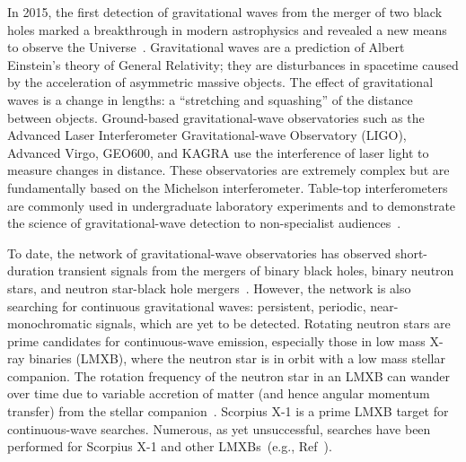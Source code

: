 \documentclass[paper-main.tex]{subfiles}
\begin{document}
In 2015, the first detection of gravitational waves from the merger of two black holes marked a breakthrough in modern astrophysics and revealed a new means to observe the Universe~\cite{GW150914}.
Gravitational waves are a prediction of Albert Einstein's theory of General Relativity; they are disturbances in spacetime caused by the acceleration of asymmetric massive objects.
The effect of gravitational waves is a change in lengths: a ``stretching and squashing'' of the distance between objects. 
Ground-based gravitational-wave observatories such as the Advanced Laser Interferometer Gravitational-wave Observatory (LIGO), Advanced Virgo, GEO600, and KAGRA use the interference of laser light to measure changes in distance. 
These observatories are extremely complex but are fundamentally based on the Michelson interferometer. 
Table-top interferometers are commonly used in undergraduate laboratory experiments and to demonstrate the science of gravitational-wave detection to non-specialist audiences~\cite{TTExhibit:2021}.


To date, the network of gravitational-wave observatories has observed short-duration transient signals from the mergers of binary black holes, binary neutron stars, and neutron star-black hole mergers~\cite{GWTC-2:2020,NSBH:2021}.
However, the network is also searching for continuous gravitational waves: persistent, periodic, near-monochromatic signals, which are yet to be detected. 
Rotating neutron stars are prime candidates for continuous-wave emission, especially those in low mass X-ray binaries (LMXB), where the neutron star is in orbit with a low mass stellar companion.
The rotation frequency of the neutron star in an LMXB can wander over time due to variable accretion of matter (and hence angular momentum transfer) from the stellar companion~\cite{xraybinaries:1997}. 
Scorpius X-1 is a prime LMXB target for continuous-wave searches. 
Numerous, as yet unsuccessful, searches have been performed for Scorpius X-1 and other LMXBs~(e.g., Ref~\cite{ScoX1O2Viterbi:2019}). 
\end{document}
